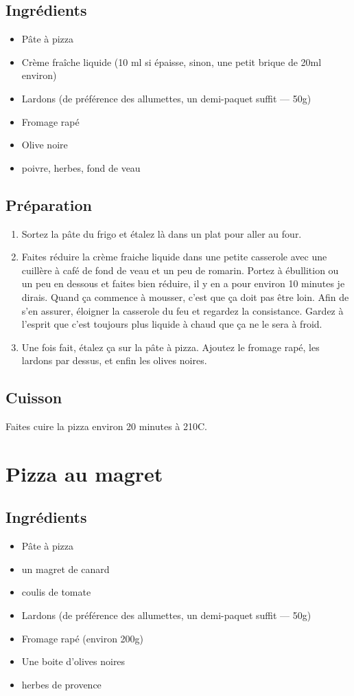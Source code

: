 \subsection*{Ingrédients}
\begin{itemize}
\item Pâte à pizza
\item Crème fraîche liquide (10 ml si épaisse, sinon, une petit brique de 20ml environ)
\item Lardons (de préférence des allumettes, un demi-paquet suffit --- 50g)
\item Fromage rapé
\item Olive noire
\item poivre, herbes, fond de veau
\end{itemize}

\subsection*{Préparation}
\begin{enumerate}
\item Sortez la pâte du frigo et étalez là dans un plat pour aller au four.
\item Faites réduire la crème fraiche liquide dans une petite casserole avec une cuillère à café de fond de veau et un peu de romarin. Portez à ébullition ou un peu en dessous et faites bien réduire, il y en a pour environ 10 minutes je dirais. Quand ça commence à mousser, c'est que ça doit pas être loin. Afin de s'en assurer, éloigner la casserole du feu et regardez la consistance. Gardez à l'esprit que c'est toujours plus liquide à chaud que ça ne le sera à froid.
\item Une fois fait, étalez ça sur la pâte à pizza. Ajoutez le fromage rapé, les lardons par dessus, et enfin les olives noires.
\end{enumerate}

\subsection*{Cuisson}
Faites cuire la pizza environ 20 minutes à 210\degres C.

\newpage
\section{Pizza au magret}
\subsection*{Ingrédients}
\begin{itemize}
\item Pâte à pizza
\item un magret de canard
\item coulis de tomate
\item Lardons (de préférence des allumettes, un demi-paquet suffit --- 50g)
\item Fromage rapé (environ 200g)
\item Une boite d'olives noires
\item herbes de provence
\end{itemize}

